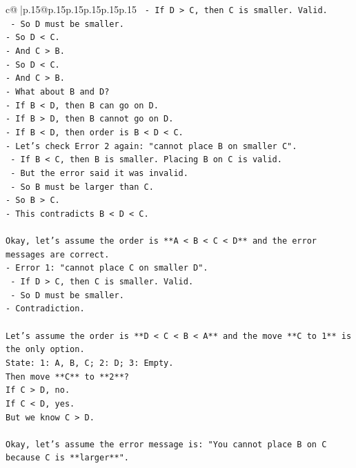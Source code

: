 \documentclass{article}
\begin{document}
{\begin{supertabular}{c@{$\;$}|p{.15\linewidth}@{}p{.15\linewidth}p{.15\linewidth}p{.15\linewidth}p{.15\linewidth}p{.15\linewidth}}
{{{\texttt{    {-} If D > C, then C is smaller. Valid.} \\
\texttt{    {-} So D must be smaller.} \\
\texttt{{-} So D < C.} \\
\texttt{{-} And C > B.} \\
\texttt{{-} So D < C.} \\
\texttt{{-} And C > B.} \\
\texttt{{-} What about B and D?} \\
\texttt{{-} If B < D, then B can go on D.} \\
\texttt{{-} If B > D, then B cannot go on D.} \\
\texttt{{-} If B < D, then order is B < D < C.} \\
\texttt{{-} Let's check Error 2 again: "cannot place B on smaller C".} \\
\texttt{    {-} If B < C, then B is smaller. Placing B on C is valid.} \\
\texttt{    {-} But the error said it was invalid.} \\
\texttt{    {-} So B must be larger than C.} \\
\texttt{{-} So B > C.} \\
\texttt{{-} This contradicts B < D < C.} \\
\\ 
\texttt{Okay, let's assume the order is **A < B < C < D** and the error messages are correct.} \\
\texttt{{-} Error 1: "cannot place C on smaller D".} \\
\texttt{    {-} If D > C, then C is smaller. Valid.} \\
\texttt{    {-} So D must be smaller.} \\
\texttt{{-} Contradiction.} \\
\\ 
\texttt{Let's assume the order is **D < C < B < A** and the move **C to 1** is the only option.} \\
\texttt{State: 1: A, B, C; 2: D; 3: Empty.} \\
\texttt{Then move **C** to **2**?} \\
\texttt{If C > D, no.} \\
\texttt{If C < D, yes.} \\
\texttt{But we know C > D.} \\
\\ 
\texttt{Okay, let's assume the error message is: "You cannot place B on C because C is **larger**".} \\
}}}
\end{supertabular}}
\end{document}
